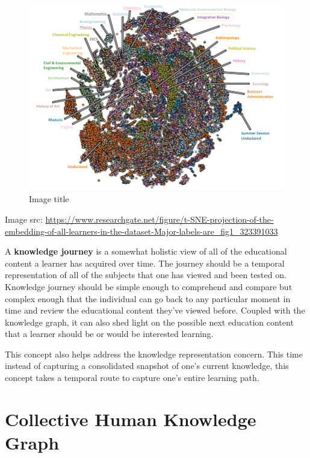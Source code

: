 \documentclass[]{book}
\theoremstyle{definition}
\theoremstyle{definition}
\theoremstyle{definition}
\theoremstyle{remark}
\begin{document}
\begin{figure}
\centering
\includegraphics{img/tsne.png}
\caption{Image title}
\end{figure}

Image src:
\url{https://www.researchgate.net/figure/t-SNE-projection-of-the-embedding-of-all-learners-in-the-dataset-Major-labels-are_fig1_323391033}

A \textbf{knowledge journey} is a somewhat holistic view of all of the
educational content a learner has acquired over time. The journey should
be a temporal representation of all of the subjects that one has viewed
and been tested on. Knowledge journey should be simple enough to
comprehend and compare but complex enough that the individual can go
back to any particular moment in time and review the educational content
they've viewed before. Coupled with the knowledge graph, it can also
shed light on the possible next education content that a learner should
be or would be interested learning.

This concept also helps address the knowledge representation concern.
This time instead of capturing a consolidated snapshot of one's current
knowledge, this concept takes a temporal route to capture one's entire
learning path.

\section{Collective Human Knowledge
Graph}\label{collective-human-knowledge-graph}
\end{document}
